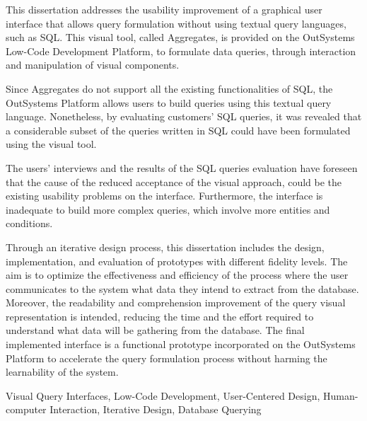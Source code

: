 This dissertation addresses the usability improvement of a graphical user interface that allows query formulation without using textual query languages, such as SQL. This visual tool, called Aggregates, is provided on the OutSystems Low-Code Development Platform, to formulate data queries, through interaction and manipulation of visual components. 

Since Aggregates do not support all the existing functionalities of SQL, the OutSystems Platform allows users to build queries using this textual query language. Nonetheless, by evaluating customers' SQL queries, it was revealed that a considerable subset of the queries written in SQL could have been formulated using the visual tool.

The users' interviews and the results of the SQL queries evaluation have foreseen that the cause of the reduced acceptance of the visual approach, could be the existing usability problems on the interface. Furthermore, the interface is inadequate to build more complex queries, which involve more entities and conditions.

Through an iterative design process, this dissertation includes the design, implementation, and evaluation of prototypes with different fidelity levels. The aim is to optimize the effectiveness and efficiency of the process where the user communicates to the system what data they intend to extract from the database. Moreover, the readability and comprehension improvement of the query visual representation is intended, reducing the time and the effort required to understand what data will be gathering from the database. The final implemented interface is a functional prototype incorporated on the OutSystems Platform to accelerate the query formulation process without harming the learnability of the system.


\begin{keywords}
Visual Query Interfaces, Low-Code Development, User-Centered Design, Human-computer Interaction, Iterative Design, Database Querying
\end{keywords} 
